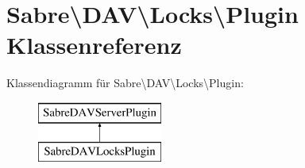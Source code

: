 \hypertarget{class_sabre_1_1_d_a_v_1_1_locks_1_1_plugin}{}\section{Sabre\textbackslash{}D\+AV\textbackslash{}Locks\textbackslash{}Plugin Klassenreferenz}
\label{class_sabre_1_1_d_a_v_1_1_locks_1_1_plugin}
Klassendiagramm für Sabre\textbackslash{}D\+AV\textbackslash{}Locks\textbackslash{}Plugin\+:\begin{figure}[H]
\begin{center}
\leavevmode
\includegraphics[height=2.000000cm]{class_sabre_1_1_d_a_v_1_1_locks_1_1_plugin}
\end{center}
\end{figure}
